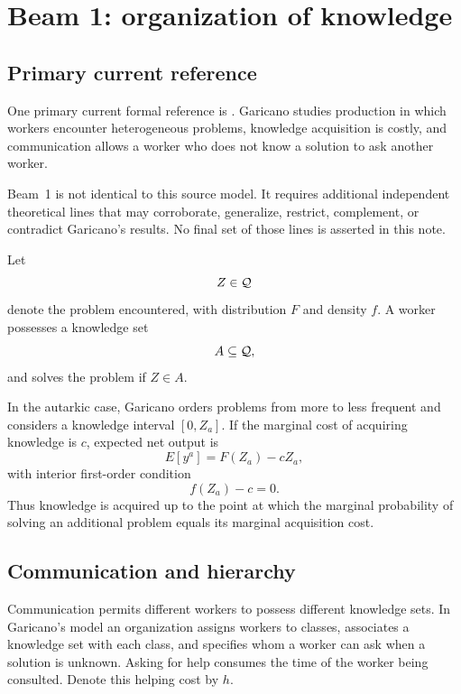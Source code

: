 \section{Beam 1: organization of knowledge}

\subsection{Primary current reference}

One primary current formal reference is \citet{garicano2000}. Garicano studies production in which
workers encounter heterogeneous problems, knowledge acquisition is costly, and communication
allows a worker who does not know a solution to ask another worker.

Beam~1 is not identical to this source model. It requires additional independent theoretical
lines that may corroborate, generalize, restrict, complement, or contradict Garicano's
results. No final set of those lines is asserted in this note.

Let
\[
Z\in\mathcal{Q}
\]
denote the problem encountered, with distribution \(F\) and density \(f\). A worker possesses
a knowledge set
\[
A\subseteq\mathcal{Q},
\]
and solves the problem if \(Z\in A\).

In the autarkic case, Garicano orders problems from more to less frequent and considers a
knowledge interval \([0,Z_a]\). If the marginal cost of acquiring knowledge is \(c\), expected
net output is
\begin{equation}
E[y^a] = F(Z_a)-cZ_a,
\end{equation}
with interior first-order condition
\begin{equation}
f(Z_a)-c=0.
\end{equation}
Thus knowledge is acquired up to the point at which the marginal probability of solving an
additional problem equals its marginal acquisition cost.

\subsection{Communication and hierarchy}

Communication permits different workers to possess different knowledge sets. In Garicano's
model an organization assigns workers to classes, associates a knowledge set with each class,
and specifies whom a worker can ask when a solution is unknown. Asking for help consumes the
time of the worker being consulted. Denote this helping cost by \(h\).


